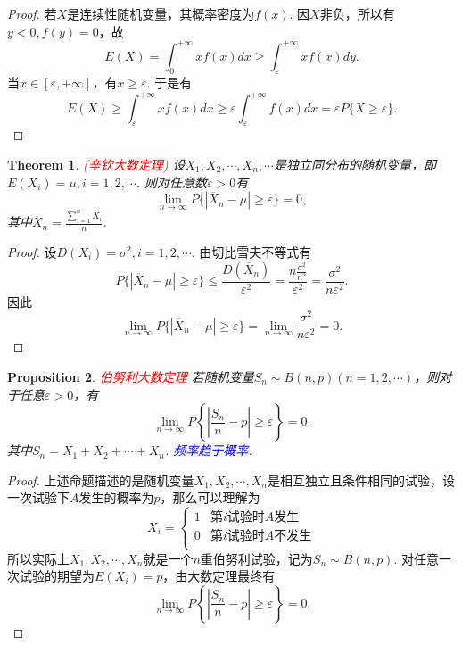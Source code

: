\documentclass{article}
\newtheorem{theorem}{Theorem}[section]
\newtheorem{proposition}[theorem]{Proposition}
\newcommand{\redt}[1]{\textcolor{red}{#1}}
\newcommand{\bluet}[1]{\textcolor{blue}{#1}}
\begin{document}
\begin{proof}
若$X$是连续性随机变量，其概率密度为$f(x)$. 因$X$非负，所以有$y < 0,f(y)=0$，故
$$
E(X) = \int_{0}^{+\infty} xf(x)dx \geq  \int_{\varepsilon}^{+\infty} xf(x)dy.
$$
当$x \in [\varepsilon,+\infty]$，有$x \geq \varepsilon$. 于是有
$$
E(X) \geq \int_{\varepsilon}^{+\infty} xf(x)dx \geq \varepsilon \int_{\varepsilon}^{+\infty}f(x)dx = \varepsilon P\{X \geq \varepsilon\}.
$$
\end{proof}

\begin{theorem}
\rm \redt{(辛钦大数定理)} 设$X_1,X_2,\cdots,X_n,\cdots$是独立同分布的随机变量，即$E(X_i) = \mu,i=1,2,\cdots$. 则对任意数$\varepsilon > 0$有
$$
\lim\limits_{n \rightarrow \infty}P\{|\overline{X}_n -\mu| \geq \varepsilon\} = 0,
$$ 
其中$\overline{X}_n = \frac{\sum\limits_{i=1}^n X_i}{n}$. 
\end{theorem}

\begin{proof}
设$D(X_i) = \sigma^2, i =1,2,\cdots$. 由切比雪夫不等式有
$$
P\{|\overline{X}_n -\mu| \geq \varepsilon\} \leq \frac{D(\overline{X}_n)}{\varepsilon^2} = \frac{n\frac{\sigma^2}{n^2}}{\varepsilon^2} = \frac{\sigma^2}{n\varepsilon^2}. 
$$
因此
$$
\lim\limits_{n \rightarrow \infty} P\{|\overline{X}_n -\mu| \geq \varepsilon\} = \lim\limits_{n \rightarrow \infty} \frac{\sigma^2}{n\varepsilon^2} = 0.
$$
\end{proof}

\begin{proposition}
\rm \redt{伯努利大数定理} 若随机变量$S_n \sim B(n,p)(n=1,2,\cdots)$，则对于任意$\varepsilon > 0$，有
$$
\lim\limits_{n \rightarrow \infty}P\left\{\left|\frac{S_n}{n} -p\right| \geq \varepsilon\right\} = 0.
$$
其中$S_n = X_1+X_2+\cdots+X_n$. \bluet{频率趋于概率}. 
\end{proposition}

\begin{proof}
\rm 上述命题描述的是随机变量$X_1,X_2,\cdots,X_n$是相互独立且条件相同的试验，设一次试验下$A$发生的概率为$p$，那么可以理解为
$$
X_i = \left\{  \begin{array}{ll}
1 & \text{第$i$试验时$A$发生}\\
0 & \text{第$i$试验时$A$不发生}\\
\end{array}  \right.
$$ 
所以实际上$X_1,X_2,\cdots,X_n$就是一个$n$重伯努利试验，记为$S_n \sim B(n,p)$. 对任意一次试验的期望为$E(X_i) = p$，由大数定理最终有
$$
\lim\limits_{n \rightarrow \infty}P\left\{\left|\frac{S_n}{n} -p\right| \geq \varepsilon\right\} = 0.
$$ 
\end{proof}
\end{document}
